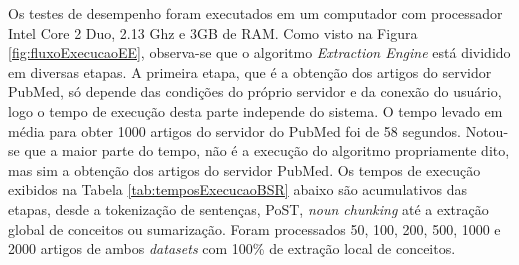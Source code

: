 Os testes de desempenho foram executados em um computador com processador Intel Core 2 Duo, 2.13 Ghz e 3GB de RAM. Como visto na Figura  \ref{fig:fluxoExecucaoEE}, observa-se que o algoritmo \emph{Extraction Engine} está dividido em diversas etapas. A primeira etapa, que é a obtenção dos artigos do servidor PubMed, só depende das condições do próprio servidor e da conexão do usuário, logo o tempo de execução desta parte independe do sistema. O tempo levado em média para obter 1000 artigos do servidor do PubMed foi de 58 segundos. Notou-se que a maior parte do tempo, não é a execução do algoritmo propriamente dito, mas sim a obtenção dos artigos do servidor PubMed. 
Os tempos de execução exibidos na Tabela \ref{tab:temposExecucaoBSR} abaixo são acumulativos das etapas, desde a tokenização de sentenças, PoST, \emph{noun chunking} até a extração global de conceitos ou sumarização. Foram processados 50, 100, 200, 500, 1000 e 2000 artigos de ambos \emph{datasets} com 100\% de extração local de conceitos.

